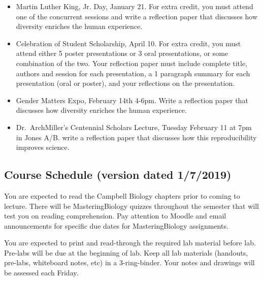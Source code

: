 \documentclass{tufte-handout}
\begin{document}
\begin{fullwidth}
\begin{itemize}
\item Martin Luther King, Jr. Day, January 21. For extra credit, you must attend one of the concurrent sessions and write a reflection paper that discusses how diversity enriches the human experience. 
\item Celebration of Student Scholarship, April 10.  For extra credit, you must attend either 5 poster presentations or 3 oral presentations, or some combination of the two.  Your reflection paper must include complete title, authors and session for each presentation, a 1 paragraph summary for each presentation (oral or poster), and your reflections on the presentation.  	
\item Gender Matters Expo, February 14th 4-6pm. Write a reflection paper that discusses how diversity enriches the human experience.
\item Dr.\ ArchMiller's Centennial Scholars Lecture, Tuesday February 11 at 7pm in Jones A/B. write a reflection paper that discusses how this reproducibility improves science.
\end{itemize}









\newpage
\subsection{Course Schedule (version dated 1/7/2019)}
%

 You are expected to read the Campbell Biology chapters prior to coming to lecture.  There will be MasteringBiology quizzes throughout the semester that will test you on reading comprehension. Pay attention to Moodle and email announcements for specific due dates for MasteringBiology assignments.

 You are expected to print and read-through the required lab material before lab. Pre-labs will be due at the beginning of lab. Keep all lab materials (handouts, pre-labs, whiteboard notes, etc) in a 3-ring-binder. Your notes and drawings will be assessed each Friday.


\end{fullwidth}
\end{document}
